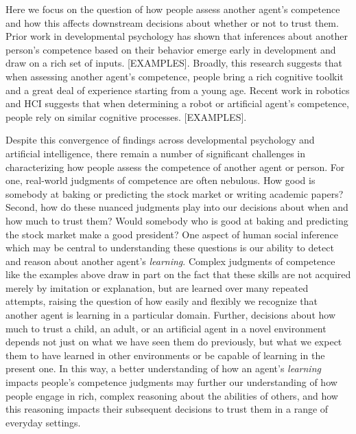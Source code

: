 \documentclass[10pt,letterpaper]{article}
\begin{document}
Here we focus on the question of how people assess another agent's competence and how this affects downstream decisions about whether or not to trust them. Prior work in developmental psychology has shown that inferences about another person's competence based on their behavior emerge early in development and draw on a rich set of inputs. [EXAMPLES]. Broadly, this research suggests that when assessing another agent's competence, people bring a rich cognitive toolkit and a great deal of experience starting from a young age. Recent work in robotics and HCI suggests that when determining a robot or artificial agent's competence, people rely on similar cognitive processes. [EXAMPLES]. 

Despite this convergence of findings across developmental psychology and artificial intelligence, there remain a number of significant challenges in characterizing how people assess the competence of another agent or person. For one, real-world judgments of competence are often nebulous. How good is somebody at baking or predicting the stock market or writing academic papers? Second, how do these nuanced judgments play into our decisions about when and how much to trust them? Would somebody who is good at baking and predicting the stock market make a good president? One aspect of human social inference which may be central to understanding these questions is our ability to detect and reason about another agent's \textit{learning}. Complex judgments of competence like the examples above draw in part on the fact that these skills are not acquired merely by imitation or explanation, but are learned over many repeated attempts, raising the question of how easily and flexibly we recognize that another agent is learning in a particular domain. Further, decisions about how much to trust a child, an adult, or an artificial agent in a novel environment depends not just on what we have seen them do previously, but what we expect them to have learned in other environments or be capable of learning in the present one. In this way, a better understanding of how an agent's \textit{learning} impacts people's competence judgments may further our understanding of how people engage in rich, complex reasoning about the abilities of others, and how this reasoning impacts their subsequent decisions to trust them in a range of everyday settings.
\end{document}
